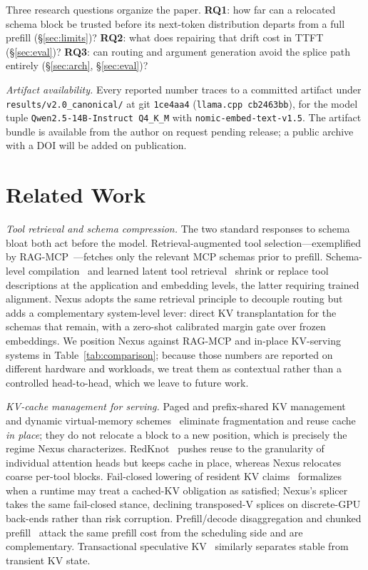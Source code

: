\documentclass[10pt,conference]{IEEEtran}
\newcommand{\code}[1]{\texttt{\small #1}}
\begin{document}
Three research questions organize the paper. \textbf{RQ1}: how far can a relocated schema block be
trusted before its next-token distribution departs from a full prefill (\S\ref{sec:limits})?
\textbf{RQ2}: what does repairing that drift cost in TTFT (\S\ref{sec:eval})? \textbf{RQ3}: can
routing and argument generation avoid the splice path entirely (\S\ref{sec:arch},
\S\ref{sec:eval})?

\emph{Artifact availability.} Every reported number traces to a committed artifact under
\code{results/v2.0\_canonical/} at git \code{1ce4aa4} (\code{llama.cpp cb2463bb}), for the model
tuple \code{Qwen2.5-14B-Instruct Q4\_K\_M} with \code{nomic-embed-text-v1.5}. The artifact bundle
is available from the author on request pending release; a public archive with a DOI will be added
on publication.

\section{Related Work}
\label{sec:related}
\emph{Tool retrieval and schema compression.} The two standard responses to schema bloat both
act before the model. Retrieval-augmented tool selection---exemplified by
RAG-MCP~\cite{ragmcp2025}---fetches only the relevant MCP schemas prior to prefill. Schema-level
compilation~\cite{tscg2026} and learned latent tool retrieval~\cite{ntilc2026} shrink or replace
tool descriptions at the application and embedding levels, the latter requiring trained
alignment. Nexus adopts the same retrieval principle to decouple routing but adds a complementary
system-level lever: direct KV transplantation for the schemas that remain, with a zero-shot
calibrated margin gate over frozen embeddings. We position Nexus against RAG-MCP and in-place
KV-serving systems in Table~\ref{tab:comparison}; because those numbers are reported on different
hardware and workloads, we treat them as contextual rather than a controlled head-to-head, which
we leave to future work.

\emph{KV-cache management for serving.} Paged and prefix-shared KV
management~\cite{kwon2023vllm,zheng2024sglang} and dynamic virtual-memory
schemes~\cite{vattention2025,ellm} eliminate fragmentation and reuse cache \emph{in place}; they do
not relocate a block to a new position, which is precisely the regime Nexus characterizes.
RedKnot~\cite{redknot2026} pushes reuse to the granularity of individual attention heads but keeps
cache in place, whereas Nexus relocates coarse per-tool blocks. Fail-closed lowering of resident KV
claims~\cite{stepanek2026} formalizes when a runtime may treat a cached-KV obligation as satisfied;
Nexus's splicer takes the same fail-closed stance, declining transposed-V splices on discrete-GPU
back-ends rather than risk corruption. Prefill/decode disaggregation and chunked
prefill~\cite{agrawal2024sarathi,patel2024splitwise,zhong2024distserve} attack the same prefill cost
from the scheduling side and are complementary. Transactional speculative KV~\cite{transkvcache}
similarly separates stable from transient KV state.
\end{document}
